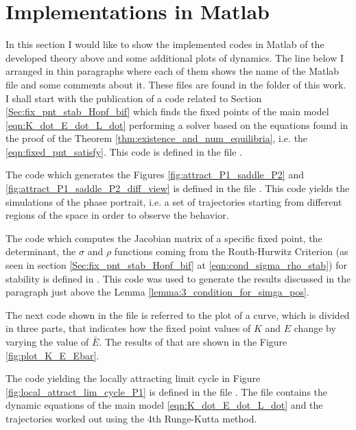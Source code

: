 \section{Implementations in Matlab}\label{app:A}
In this section I would like to show the implemented codes in Matlab of the developed theory above and some additional plots of dynamics. The line below I arranged in thin paragraphs where each of them shows the name of the Matlab file and some comments about it. These files are found in the folder of this work.\\
I shall start with the publication of a code related to Section \ref{Sec:fix_pnt_stab_Hopf_bif} which finds the fixed points of the main model \eqref{eqn:K_dot_E_dot_L_dot} performing a solver based on the equations found in the proof of the Theorem \ref{thm:existence_and_num_equilibria}, i.e. the \eqref{eqn:fixed_pnt_satisfy}. This code is defined in the file . 

The code which generates the Figures \ref{fig:attract_P1_saddle_P2} and \ref{fig:attract_P1_saddle_P2_diff_view} is defined in the file . This code yields the simulations of the phase portrait, i.e. a set of trajectories starting from different regions of the space in order to observe the behavior. 

The code which computes the Jacobian matrix of a specific fixed point, the determinant, the $\sigma$ and $\rho$ functions coming from the Routh-Hurwitz Criterion (as seen in section \ref{Sec:fix_pnt_stab_Hopf_bif} at \eqref{eqn:cond_sigma_rho_stab}) for stability is defined in . This code was used to generate the results discussed in the paragraph just above the Lemma \ref{lemma:3_condition_for_simga_pos}.

The next code shown in the file  is referred to the plot of a curve, which is divided in three parts, that indicates how the fixed point values of $K$ and $E$ change by varying the value of $\bar{E}$. The results of that are shown in the Figure \ref{fig:plot_K_E_Ebar}.

The code yielding the locally attracting limit cycle in Figure \ref{fig:local_attract_lim_cycle_P1} is defined in the file . The file contains the dynamic equations of the main model \eqref{eqn:K_dot_E_dot_L_dot} and the trajectories worked out using the 4th Runge-Kutta method.

